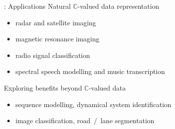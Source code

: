 \documentclass{beamer}
\newcommand{\cplx}{\mathbb{C}}
\begin{document}
\begin{frame}[c]{\insertsection: Applications}
  Natural $\cplx$-valued data representation
  \begin{itemize}
    \pause
    \item radar and satellite imaging
      {\tiny \\ \quad
        \citep{hirose_complex-valued_2009,hansch_complex-valued_2010,zhang_complex-valued_2017}}

    \smallskip
    \item magnetic resonance imaging
      {\tiny \\ \quad
        \citep{hui_mri_1995,wang_deepcomplexmri_2020}}

    \pause
    \smallskip
    \item radio signal classification
      {\tiny \\ \quad
        \citep{yang_complex_2019,tarver_design_2019}}

    \smallskip
    \item spectral speech modelling and music transcription
      {\tiny \\ \quad
        \citep{wisdom_full-capacity_2016,trabelsi_deep_2018,yang_complex_2019}}
  \end{itemize}

  \pause
  \medskip
  Exploring benefits beyond $\cplx$-valued data
  \begin{itemize}
    \item sequence modelling, dynamical system identification
      {\tiny \\ \quad
        \citep{danihelka_associative_2016,wisdom_full-capacity_2016}}

    \smallskip
    \item image classification, road~/~lane segmentation  %
      {\tiny \\ \quad
        \citep{popa_complex-valued_2017,trabelsi_deep_2018,gaudet_deep_2018}}
  \end{itemize}

\end{frame}
\end{document}
